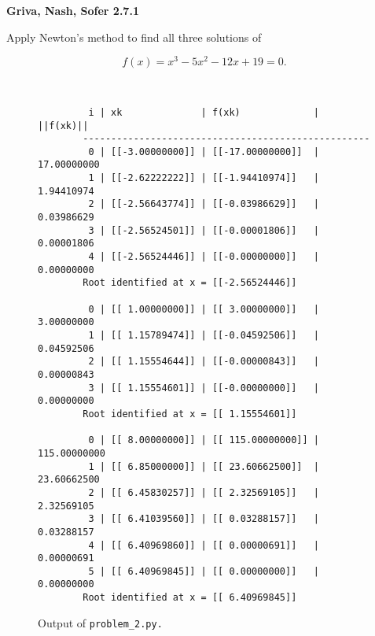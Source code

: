 \textbf{Griva, Nash, Sofer 2.7.1}

Apply Newton's method to find all three solutions of 

$$
f(x) = x^3 - 5x^2 - 12x + 19 = 0.
$$

\begin{solution}
  \ \\
  \small
  \begin{figure}[h]
    \begin{verbatim}
         i | xk              | f(xk)             | ||f(xk)||    
        ---------------------------------------------------
         0 | [[-3.00000000]] | [[-17.00000000]]  | 17.00000000
         1 | [[-2.62222222]] | [[-1.94410974]]   | 1.94410974
         2 | [[-2.56643774]] | [[-0.03986629]]   | 0.03986629
         3 | [[-2.56524501]] | [[-0.00001806]]   | 0.00001806
         4 | [[-2.56524446]] | [[-0.00000000]]   | 0.00000000
        Root identified at x = [[-2.56524446]]
        
         0 | [[ 1.00000000]] | [[ 3.00000000]]   | 3.00000000
         1 | [[ 1.15789474]] | [[-0.04592506]]   | 0.04592506
         2 | [[ 1.15554644]] | [[-0.00000843]]   | 0.00000843
         3 | [[ 1.15554601]] | [[-0.00000000]]   | 0.00000000
        Root identified at x = [[ 1.15554601]]
        
         0 | [[ 8.00000000]] | [[ 115.00000000]] | 115.00000000
         1 | [[ 6.85000000]] | [[ 23.60662500]]  | 23.60662500
         2 | [[ 6.45830257]] | [[ 2.32569105]]   | 2.32569105
         3 | [[ 6.41039560]] | [[ 0.03288157]]   | 0.03288157
         4 | [[ 6.40969860]] | [[ 0.00000691]]   | 0.00000691
         5 | [[ 6.40969845]] | [[ 0.00000000]]   | 0.00000000
        Root identified at x = [[ 6.40969845]]
    \end{verbatim}
    \caption{Output of \texttt{problem\_2.py.}}
  \end{figure}
  \normalsize
  \ \\
\end{solution}